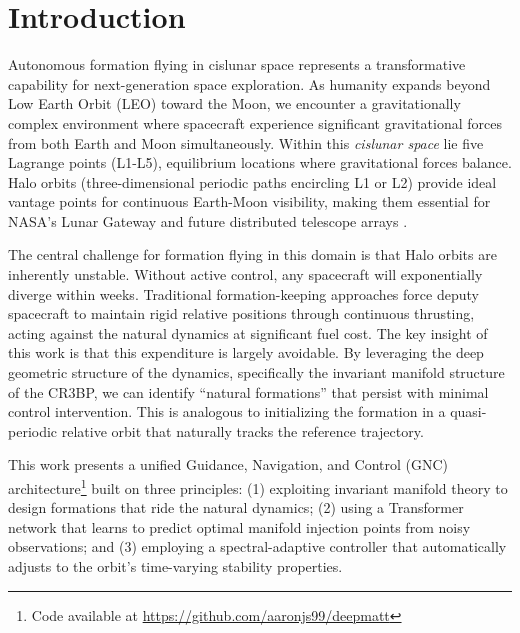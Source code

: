 \documentclass[10pt,letterpaper]{article}
\begin{document}
\section{Introduction}

Autonomous formation flying in cislunar space represents a transformative capability for next-generation space exploration. As humanity expands beyond Low Earth Orbit (LEO) toward the Moon, we encounter a gravitationally complex environment where spacecraft experience significant gravitational forces from both Earth and Moon simultaneously. Within this \textit{cislunar space} lie five Lagrange points (L1-L5), equilibrium locations where gravitational forces balance. Halo orbits (three-dimensional periodic paths encircling L1 or L2) provide ideal vantage points for continuous Earth-Moon visibility, making them essential for NASA's Lunar Gateway and future distributed telescope arrays \cite{howell1984three, breakwell1979halo}.

The central challenge for formation flying in this domain is that Halo orbits are inherently unstable. Without active control, any spacecraft will exponentially diverge within weeks. Traditional formation-keeping approaches force deputy spacecraft to maintain rigid relative positions through continuous thrusting, acting against the natural dynamics at significant fuel cost. The key insight of this work is that this expenditure is largely avoidable. By leveraging the deep geometric structure of the dynamics, specifically the invariant manifold structure of the CR3BP, we can identify ``natural formations'' that persist with minimal control intervention. This is analogous to initializing the formation in a quasi-periodic relative orbit that naturally tracks the reference trajectory.

This work presents a unified Guidance, Navigation, and Control (GNC) architecture\footnote{Code available at \url{https://github.com/aaronjs99/deepmatt}} built on three principles: (1) exploiting invariant manifold theory to design formations that ride the natural dynamics; (2) using a Transformer network that learns to predict optimal manifold injection points from noisy observations; and (3) employing a spectral-adaptive controller that automatically adjusts to the orbit's time-varying stability properties.
\end{document}
